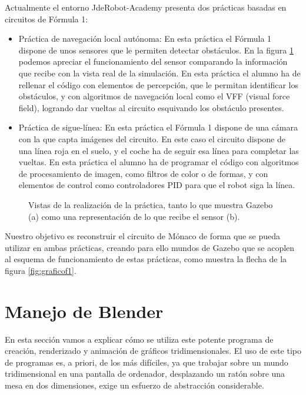 Actualmente el entorno JdeRobot-Academy presenta dos prácticas basadas en circuitos de Fórmula 1:
\begin{itemize}
	\item Práctica de navegación local autónoma: En esta práctica el Fórmula 1 dispone de unos sensores que le permiten detectar obstáculos. En la figura \ref{fig:vff} podemos apreciar el funcionamiento del sensor comparando la información que recibe con la vista real de la simulación. En esta práctica el alumno ha de rellenar el código con elementos de percepción, que le permitan identificar los obstáculos, y con algoritmos de navegación local como el VFF (visual force field), logrando dar vueltas al circuito esquivando los obstáculo presentes.
	
	\item Práctica de sigue-línea: En esta práctica el Fórmula 1 dispone de una cámara con la que capta imágenes del circuito. En este caso el circuito dispone de una línea roja en el suelo, y el coche ha de seguir esa línea para completar las vueltas. En esta práctica el alumno ha de programar el código con algoritmos de procesamiento de imagen, como filtros de color o de formas, y con elementos de control como controladores PID para que el robot siga la línea.
\end{itemize}
	
\begin{figure}[h]
	\centering
	\caption[Vistas de la práctica de navegación local del F1]{Vistas de la realización de la práctica, tanto lo que muestra Gazebo (a) como una representación de lo que recibe el sensor (b).} \label{fig:vff}
\end{figure}

Nuestro objetivo es reconstruir el circuito de Mónaco de forma que se pueda utilizar en ambas prácticas, creando para ello mundos de Gazebo que se acoplen al esquema de funcionamiento de estas prácticas, como muestra la flecha de la figura \ref{fig:graficof1}.

\section{Manejo de Blender}
\label{sec:circarr_manejodeblender}

En esta sección vamos a explicar cómo se utiliza este potente programa de creación, renderizado y animación de gráficos tridimensionales. El uso de este tipo de programas es, a priori, de los más difíciles, ya que trabajar sobre un mundo tridimensional en una pantalla de ordenador, desplazando un ratón sobre una mesa en dos dimensiones, exige un esfuerzo de abstracción considerable.


